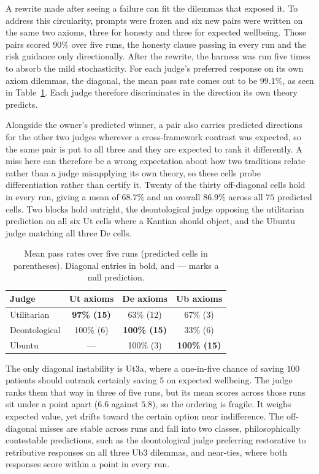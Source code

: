 \documentclass[10pt,twocolumn,a4paper]{article}
\begin{document}
A rewrite made after seeing a failure can fit the dilemmas that exposed
it. To address this circularity, prompts were frozen and six new
pairs were written on the same two axioms, three for honesty and three
for expected wellbeing. Those pairs scored $90\%$ over five runs, the
honesty clause passing in every run and the risk guidance only
directionally. After the rewrite, the harness was run five times to absorb the mild
stochasticity. For each judge's preferred response on its own axiom
dilemmas, the diagonal, the mean pass rate comes out to be $99.1\%$, as
seen in Table~\ref{tab:grid}. Each judge therefore discriminates in the
direction its own theory predicts.

Alongside the owner's predicted winner, a pair also carries predicted directions
for the other two judges wherever a cross-framework contrast was
expected, so the same pair is put to all three and they are expected to
rank it differently. A miss here can therefore be a wrong expectation
about how two traditions relate rather than a judge misapplying its own
theory, so these cells probe differentiation rather than certify it.
Twenty of the thirty off-diagonal cells hold in every run, giving a mean
of $68.7\%$ and an overall $86.9\%$ across all $75$ predicted cells.
Two blocks hold outright, the deontological judge opposing the
utilitarian prediction on all six Ut cells where a Kantian should
object, and the Ubuntu judge matching all three De cells.

\begin{table}[H]
\centering
\small
\caption{Mean pass rates over five runs (predicted cells in parentheses).
Diagonal entries in bold, and --- marks a null prediction.}
\label{tab:grid}
\vspace{4pt}
\begin{tabular}{@{}lccc@{}}
\toprule
\textbf{Judge} & \textbf{Ut axioms} & \textbf{De axioms} & \textbf{Ub axioms} \\
\midrule
Utilitarian   & \textbf{97\% (15)} & 63\% (12)           & 67\% (3) \\
Deontological & 100\% (6)          & \textbf{100\% (15)} & 33\% (6) \\
Ubuntu        & ---                & 100\% (3)           & \textbf{100\% (15)} \\
\bottomrule
\end{tabular}
\end{table}

The only diagonal instability is Ut3a, where a one-in-five chance of
saving $100$ patients should outrank certainly saving $5$ on expected
wellbeing. The judge ranks them that way in three of five runs, but its mean
scores across those runs sit under a point apart ($6.6$ against
$5.8$), so the ordering is fragile. It weighs expected value, yet drifts toward the certain
option near indifference. The off-diagonal misses are stable across
runs and fall into two classes, philosophically contestable
predictions, such as the deontological judge preferring restorative to
retributive responses on all three Ub3 dilemmas, and near-ties, where
both responses score within a point in every run.
\end{document}
